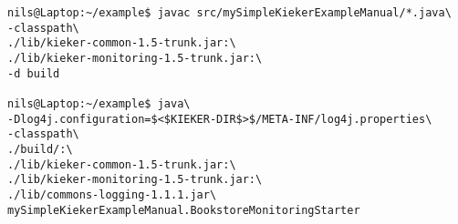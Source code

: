 \begin{lstlisting} 			
nils@Laptop:~/example$ javac src/mySimpleKiekerExampleManual/*.java\
-classpath\ 		
./lib/kieker-common-1.5-trunk.jar:\
./lib/kieker-monitoring-1.5-trunk.jar:\
-d build

nils@Laptop:~/example$ java\
-Dlog4j.configuration=$<$KIEKER-DIR$>$/META-INF/log4j.properties\
-classpath\ 	
./build/:\
./lib/kieker-common-1.5-trunk.jar:\
./lib/kieker-monitoring-1.5-trunk.jar:\
./lib/commons-logging-1.1.1.jar\
mySimpleKiekerExampleManual.BookstoreMonitoringStarter 
\end{lstlisting}